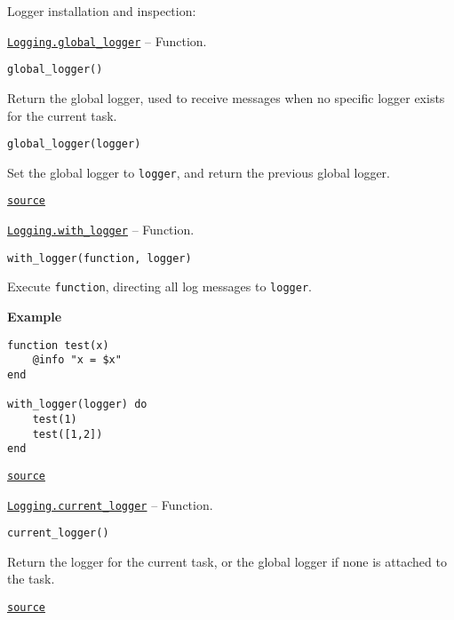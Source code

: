 Logger installation and inspection:


\hypertarget{4306559652149699055}{}
\hyperlink{4306559652149699055}{\texttt{Logging.global\_logger}}  -- {Function.}

\begin{adjustwidth}{2em}{0pt}


\begin{verbatim}
global_logger()
\end{verbatim}

Return the global logger, used to receive messages when no specific logger exists for the current task.


\begin{lstlisting}
global_logger(logger)
\end{lstlisting}

Set the global logger to \texttt{logger}, and return the previous global logger.



\href{https://github.com/JuliaLang/julia/blob/9058264a69f9efc1af805c4473c946f87859b731/base/logging.jl#L566-L575}{\texttt{source}}


\end{adjustwidth}
\hypertarget{14383079235362132941}{}
\hyperlink{14383079235362132941}{\texttt{Logging.with\_logger}}  -- {Function.}

\begin{adjustwidth}{2em}{0pt}


\begin{verbatim}
with_logger(function, logger)
\end{verbatim}

Execute \texttt{function}, directing all log messages to \texttt{logger}.

\textbf{Example}


\begin{verbatim}
function test(x)
    @info "x = $x"
end

with_logger(logger) do
    test(1)
    test([1,2])
end
\end{verbatim}



\href{https://github.com/JuliaLang/julia/blob/9058264a69f9efc1af805c4473c946f87859b731/base/logging.jl#L584-L601}{\texttt{source}}


\end{adjustwidth}
\hypertarget{1207364331935599285}{}
\hyperlink{1207364331935599285}{\texttt{Logging.current\_logger}}  -- {Function.}

\begin{adjustwidth}{2em}{0pt}


\begin{verbatim}
current_logger()
\end{verbatim}

Return the logger for the current task, or the global logger if none is attached to the task.



\href{https://github.com/JuliaLang/julia/blob/9058264a69f9efc1af805c4473c946f87859b731/base/logging.jl#L606-L611}{\texttt{source}}


\end{adjustwidth}

